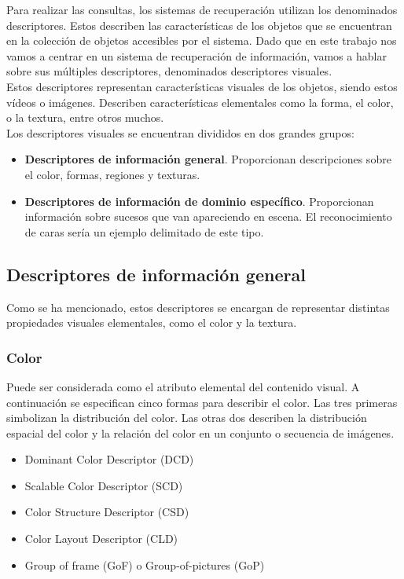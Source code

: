 Para realizar las consultas, los sistemas de recuperación utilizan los denominados descriptores. Estos describen las características de los objetos que se encuentran en la colección de objetos accesibles por el sistema. Dado que en este trabajo nos vamos a centrar en un sistema de recuperación de información, vamos a hablar sobre sus múltiples descriptores, denominados descriptores visuales.\\

Estos descriptores representan características visuales de los objetos, siendo estos vídeos o imágenes. Describen características elementales como la forma, el color, o la textura, entre otros muchos.\\

Los descriptores visuales se encuentran divididos en dos grandes grupos:

\begin{itemize}

\item \textbf{Descriptores de información general}. Proporcionan descripciones sobre el color, formas, regiones y texturas.

\item \textbf{Descriptores de información de dominio específico}. Proporcionan información sobre sucesos que van apareciendo en escena. El reconocimiento de caras sería un ejemplo delimitado de este tipo.

\end{itemize}

\subsection{Descriptores de información general}

Como se ha mencionado, estos descriptores se encargan de representar distintas propiedades visuales elementales, como el color y la textura.

\subsubsection{Color}

Puede ser considerada como el atributo elemental del contenido visual. A continuación se especifican cinco formas para describir el color. Las tres primeras simbolizan la distribución del color. Las otras dos describen la distribución espacial del color y la relación del color en un conjunto o secuencia de imágenes.

\begin{itemize}
\item Dominant Color Descriptor (DCD)
\item Scalable Color Descriptor (SCD)
\item Color Structure Descriptor (CSD)
\item Color Layout Descriptor (CLD)
\item Group of frame (GoF) o Group-of-pictures (GoP)
\end{itemize}

